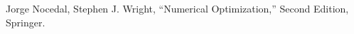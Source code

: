 \documentclass[conference]{IEEEtran}
\begin{document}
\section*{}

\begin{thebibliography}{00}
 Jorge Nocedal, Stephen J. Wright, ``Numerical Optimization,'' Second Edition, Springer.
\end{thebibliography}
\end{document}
